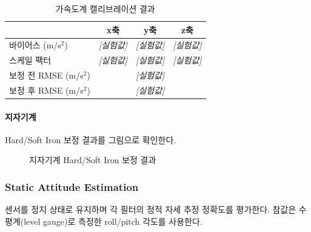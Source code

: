             \begin{table}[H]
                \centering
                \caption{가속도계 캘리브레이션 결과}
                \label{tab:accel_calib}
                \begin{tabular}{lccc}
                    \toprule
                    & x축 & y축 & z축 \\
                    \midrule
                    바이어스 (m/s$^2$)   & \textit{[실험값]} & \textit{[실험값]} & \textit{[실험값]} \\
                    스케일 팩터           & \textit{[실험값]} & \textit{[실험값]} & \textit{[실험값]} \\
                    보정 전 RMSE (m/s$^2$) & \multicolumn{3}{c}{\textit{[실험값]}} \\
                    보정 후 RMSE (m/s$^2$) & \multicolumn{3}{c}{\textit{[실험값]}} \\
                    \bottomrule
                \end{tabular}
            \end{table}
            
            \paragraph{지자기계}
                Hard/Soft Iron 보정 결과를 그림으로 확인한다.
            
                \begin{figure}[H]
                    \centering
                    \caption{지자기계 Hard/Soft Iron 보정 결과}
                    \label{fig:mag_calib}
                \end{figure}

        \subsubsection{Static Attitude Estimation}
            센서를 정지 상태로 유지하며 각 필터의 정적 자세 추정 정확도를 평가한다. 참값은 수평계(level gauge)로 측정한 roll/pitch 각도를 사용한다.\\

